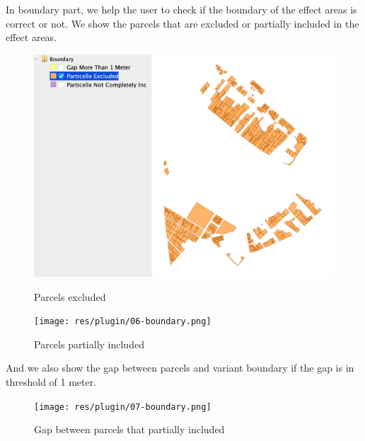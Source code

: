 In boundary part, we help the user to check if the boundary of the effect areas is correct or not.
We show the parcels that are excluded or partially included in the effect areas.
\begin{figure}[H]
    \centering
    \begin{minipage}{0.48\textwidth}
        \centering
        \includegraphics[width=\textwidth]{res/plugin/05-boundary}
        \caption{Parcels excluded}
        \label{fig:pl-boundary}
    \end{minipage}
    \hfill
    \begin{minipage}{0.48\textwidth}
        \centering
        \texttt{[image: res/plugin/06-boundary.png]}
        \caption{Parcels partially included}
        \label{fig:pl-boundary-2}
    \end{minipage}
\end{figure}

And we also show the gap between parcels and variant boundary if the gap is in threshold of 1 meter.
\begin{figure}[H]
    \centering
    \texttt{[image: res/plugin/07-boundary.png]}
    \caption{Gap between parcels that partially included}
    \label{fig:pl-boundary-3}
\end{figure}